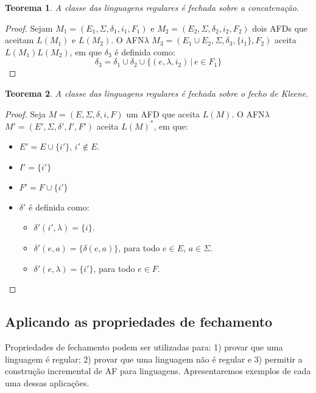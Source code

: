 \documentclass[a4paper]{article}
\newtheorem{Theorem}{Teorema}
\theoremstyle{definition}
\begin{document}
  \begin{Theorem}
    A classe das linguagens regulares é fechada sobre a concatenação.
  \end{Theorem}
  \begin{proof}
    Sejam $M_1=(E_1,\Sigma,\delta_1,i_1,F_1)$ e
    $M_2=(E_2,\Sigma,\delta_2,i_2,F_2)$
    dois AFDs que aceitam $L(M_1)$ e $L(M_2)$.
    O AFN$\lambda$ $M_3 =(E_1 \cup E_2, \Sigma, \delta_3, \{i_1\}, F_2)$ aceita
    $L(M_1)L(M_2)$, em que $\delta_3$ é definida como:
    \[
      \delta_3 = \delta_1 \cup \delta_2 \cup \{(e,\lambda, i_2)\,|\,e \in F_1\} 
    \]
  \end{proof}

  \begin{Theorem}
    A classe das linguagens regulares é fechada sobre o fecho de Kleene.
  \end{Theorem}
  \begin{proof}
    Seja $M = (E,\Sigma,\delta, i, F)$ um AFD que aceita $L(M)$. O AFN$\lambda$
    $M' = (E', \Sigma, \delta', I', F')$ aceita $L(M)^*$, em que:
    \begin{itemize}
      \item $E' = E \cup\{i'\},\, i' \not\in E$.
      \item $I' = \{i'\}$
      \item $F' = F \cup \{i'\}$
      \item $\delta'$ é definida como:
        \begin{itemize}
        \item $\delta'(i',\lambda) = \{i\}$.
        \item $\delta'(e,a) = \{\delta(e,a)\}$, para todo $e\in E$,
          $a\in\Sigma$.
        \item $\delta'(e,\lambda) = \{i'\}$, para todo $e \in F$.
        \end{itemize}
    \end{itemize}
  \end{proof}

  \subsection{Aplicando as propriedades de fechamento}

  Propriedades de fechamento podem ser utilizadas para: 1) provar que uma
  linguagem é regular; 2) provar que uma linguagem não é regular e 3)
  permitir a construção incremental de AF para linguagens. Apresentaremos
  exemplos de cada uma dessas aplicações.
\end{document}
